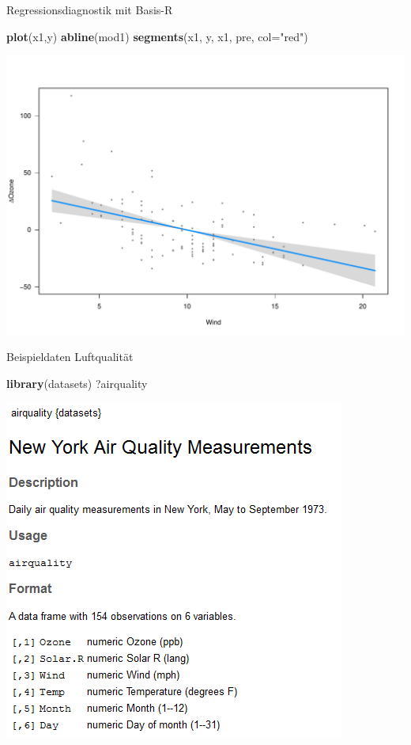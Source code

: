 \documentclass[ignorenonframetext,]{beamer}
\newenvironment{Shaded}{}{}
\newcommand{\KeywordTok}[1]{\textcolor[rgb]{0.00,0.44,0.13}{\textbf{{#1}}}}
\newcommand{\DataTypeTok}[1]{\textcolor[rgb]{0.56,0.13,0.00}{{#1}}}
\newcommand{\StringTok}[1]{\textcolor[rgb]{0.25,0.44,0.63}{{#1}}}
\newcommand{\NormalTok}[1]{{#1}}
\begin{document}
\begin{frame}[fragile]{Regressionsdiagnostik mit Basis-R}

\begin{Shaded}
\begin{Highlighting}[]
\KeywordTok{plot}\NormalTok{(x1,y)}
\KeywordTok{abline}\NormalTok{(mod1)}
\KeywordTok{segments}\NormalTok{(x1, y, x1, pre, }\DataTypeTok{col=}\StringTok{"red"}\NormalTok{)}
\end{Highlighting}
\end{Shaded}

\includegraphics{R_intern_files/figure-beamer/unnamed-chunk-305-1.pdf}

\end{frame}

\begin{frame}[fragile]{Beispieldaten Luftqualität}

\begin{Shaded}
\begin{Highlighting}[]
\KeywordTok{library}\NormalTok{(datasets)}
\NormalTok{?airquality}
\end{Highlighting}
\end{Shaded}

\includegraphics{./tex2pdf.956/9d1d4578d8325405517057b022c0b78c64a2489e.png}

\end{frame}
\end{document}
